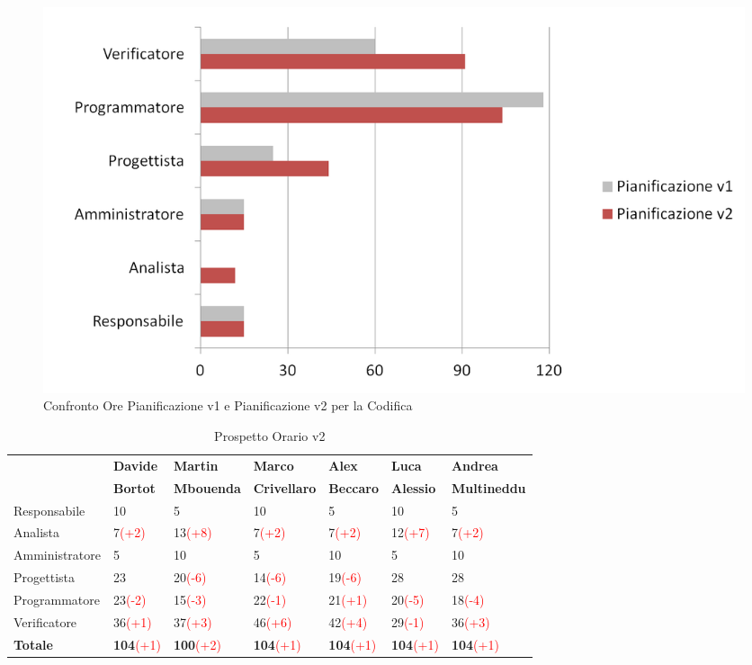 \documentclass[a4paper,11pt]{article}
\begin{document}
		\begin{figure}[h!]
		    \centering
			\includegraphics[scale=0.7]{../Images/chart-Confronto_Pianificazioni1vs2_Codifica.png}
			\caption{Confronto Ore Pianificazione v1 e Pianificazione v2 per la Codifica}
		\end{figure}		
		
		\begin{table}[h!]
		\hspace{0.2cm}\begin{tabular}{l l l l l l l}
		 	& \textbf{Davide} & \textbf{Martin} & \textbf{Marco} & \textbf{Alex} & \textbf{Luca} & \textbf{Andrea}\\
			 & \textbf{Bortot} & \textbf{Mbouenda} & \textbf{Crivellaro} & \textbf{Beccaro} & \textbf{Alessio} & \textbf{Multineddu}\\
			\midrule
			Responsabile 	& 10 & 5  & 10  & 5  & 10 & 5 \\
			Analista 		& 7\textcolor{red}{(+2)}  & 13\textcolor{red}{(+8)}  & 7\textcolor{red}{(+2)}   & 7\textcolor{red}{(+2)}  & 12\textcolor{red}{(+7)}  & 7\textcolor{red}{(+2)} \\
			Amministratore 	& 5  & 10 & 5   & 10 & 5  & 10\\
			Progettista 	& 23 & 20\textcolor{red}{(-6)} & 14\textcolor{red}{(-6)}  & 19\textcolor{red}{(-6)} & 28 & 28\\
			Programmatore 	& 23\textcolor{red}{(-2)} & 15\textcolor{red}{(-3)} & 22\textcolor{red}{(-1)}  & 21\textcolor{red}{(+1)} & 20\textcolor{red}{(-5)} & 18\textcolor{red}{(-4)}\\
			Verificatore 	& 36\textcolor{red}{(+1)} & 37\textcolor{red}{(+3)} & 46\textcolor{red}{(+6)}  & 42\textcolor{red}{(+4)} & 29\textcolor{red}{(-1)} & 36\textcolor{red}{(+3)}\\
			\midrule
			\textbf{Totale} & \textbf{104}\textcolor{red}{(+1)} & \textbf{100}\textcolor{red}{(+2)} & \textbf{104}\textcolor{red}{(+1)} & \textbf{104}\textcolor{red}{(+1)} & \textbf{104}\textcolor{red}{(+1)} & \textbf{104}\textcolor{red}{(+1)}
		\end{tabular}
	\caption{Prospetto Orario v2}
	\end{table}	
	\clearpage	
		
\end{document}
